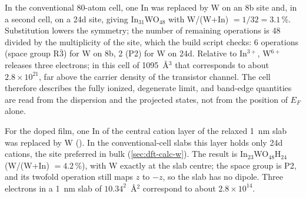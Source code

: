 In the conventional 80-atom cell, one In was replaced by W on an 8b site and, in a second cell, on a 24d site, giving
In$_{31}$WO$_{48}$ with W/(W+In) $= 1/32 = 3.1$\,\%. Substitution lowers the symmetry; the number of remaining operations
is 48 divided by the multiplicity of the site, which the build script checks: 6 operations (space group R$\bar{3}$) for
W on 8b, 2 (P2) for W on 24d. Relative to In$^{3+}$, W$^{6+}$ releases three electrons; in this cell of 1095~\AA$^3$
that corresponds to about $2.8\times10^{21}$\cmcu{}, far above the carrier density of the transistor channel. The cell
therefore describes the fully ionized, degenerate limit, and band-edge quantities are read from the dispersion and the
projected states, not from the position of $E_F$ alone.

For the doped film, one In of the central cation layer of the relaxed 1~nm slab was replaced by W
(). In the conventional-cell slabs this layer holds only 24d cations, the site preferred in
bulk (\cref{sec:dft-calc-w}). The result is In$_{23}$WO$_{48}$H$_{24}$ (W/(W+In) $= 4.2$\,\%), with W exactly at the slab
centre; the space group is P2, and its twofold operation still maps $z$ to $-z$, so the slab has no dipole. Three
electrons in a 1~nm slab of $10.34^2$~\AA$^2$ correspond to about $2.8\times10^{14}$\cmsq.


